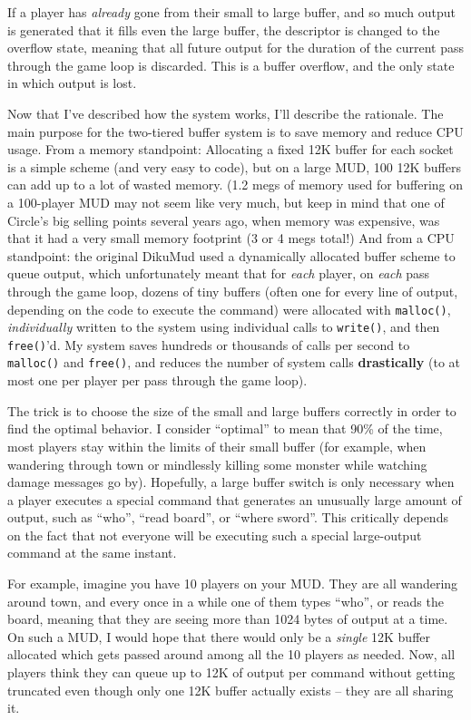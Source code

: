 \documentclass[11pt]{article}
\begin{document}
If a player has {\em already} gone from their small to large buffer, and so much output is generated that it fills even the large buffer, the descriptor is changed to the overflow state, meaning that all future output for the duration of the current pass through the game loop is discarded.  This is a buffer overflow, and the only state in which output is lost.
\par
Now that I've described how the system works, I'll describe the rationale.  The main purpose for the two-tiered buffer system is to save memory and reduce CPU usage.  From a memory standpoint: Allocating a fixed 12K buffer for each socket is a simple scheme (and very easy to code), but on a large MUD, 100 12K buffers can add up to a lot of wasted memory.  (1.2 megs of memory used for buffering on a 100-player MUD may not seem like very much, but keep in mind that one of Circle's big selling points several years ago, when memory was expensive, was that it had a very small memory footprint (3 or 4 megs total!)  And from a CPU standpoint: the original DikuMud used a dynamically allocated buffer scheme to queue output, which unfortunately meant that for {\em each} player, on {\em each} pass through the game loop, dozens of tiny buffers (often one for every line of output, depending on the code to execute the command) were allocated with \texttt{malloc()}, {\em individually} written to the system using individual calls to \texttt{write()}, and then \texttt{free()}'d.  My system saves hundreds or thousands of calls per second to \texttt{malloc()} and \texttt{free()}, and reduces the number of system calls {\bf drastically} (to at most one per player per pass through the game loop).
\par
The trick is to choose the size of the small and large buffers correctly in order to find the optimal behavior.  I consider ``optimal'' to mean that 90\% of the time, most players stay within the limits of their small buffer (for example, when wandering through town or mindlessly killing some monster while watching damage messages go by).  Hopefully, a large buffer switch is only necessary when a player executes a special command that generates an unusually large amount of output, such as ``who'', ``read board'', or ``where sword''.  This critically depends on the fact that not everyone will be executing such a special large-output command at the same instant.
\par
For example, imagine you have 10 players on your MUD.  They are all wandering around town, and every once in a while one of them types ``who'', or reads the board, meaning that they are seeing more than 1024 bytes of output at a time.  On such a MUD, I would hope that there would only be a {\em single} 12K buffer allocated which gets passed around among all the 10 players as needed.  Now, all players think they can queue up to 12K of output per command without getting truncated even though only one 12K buffer actually exists -- they are all sharing it.
\end{document}
